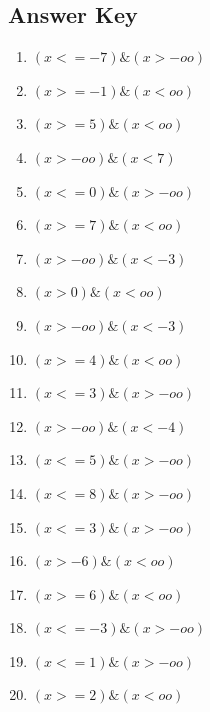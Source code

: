 \documentclass{article}
\begin{document}
\newpage

\subsection*{Answer Key}

\begin{enumerate}
\item $\displaystyle (x <= -7) \& (x > -oo) $ \ 
\item $\displaystyle (x >= -1) \& (x < oo) $ \ 
\item $\displaystyle (x >= 5) \& (x < oo) $ \ 
\item $\displaystyle (x > -oo) \& (x < 7) $ \ 
\item $\displaystyle (x <= 0) \& (x > -oo) $ \ 
\item $\displaystyle (x >= 7) \& (x < oo) $ \ 
\item $\displaystyle (x > -oo) \& (x < -3) $ \ 
\item $\displaystyle (x > 0) \& (x < oo) $ \ 
\item $\displaystyle (x > -oo) \& (x < -3) $ \ 
\item $\displaystyle (x >= 4) \& (x < oo) $ \ 
\item $\displaystyle (x <= 3) \& (x > -oo) $ \ 
\item $\displaystyle (x > -oo) \& (x < -4) $ \ 
\item $\displaystyle (x <= 5) \& (x > -oo) $ \ 
\item $\displaystyle (x <= 8) \& (x > -oo) $ \ 
\item $\displaystyle (x <= 3) \& (x > -oo) $ \ 
\item $\displaystyle (x > -6) \& (x < oo) $ \ 
\item $\displaystyle (x >= 6) \& (x < oo) $ \ 
\item $\displaystyle (x <= -3) \& (x > -oo) $ \ 
\item $\displaystyle (x <= 1) \& (x > -oo) $ \ 
\item $\displaystyle (x >= 2) \& (x < oo) $ \ 

\end{enumerate}
\end{document}
